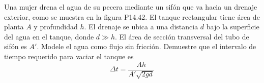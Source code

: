 \item Una mujer drena el agua de su pecera mediante un sifón que va hacia un drenaje exterior, como se muestra en la figura P14.42. El tanque rectangular tiene área de planta $A$ y profundidad $h$. El drenaje se ubica a una distancia $d$ bajo la superficie del agua en el tanque, donde $d \gg h$. El área de sección transversal del tubo de sifón es $A'$. Modele el agua como flujo sin fricción. Demuestre que el intervalo de tiempo requerido para vaciar el tanque es
$$ \Delta t = \frac{A h}{A' \sqrt{2gd}} $$
